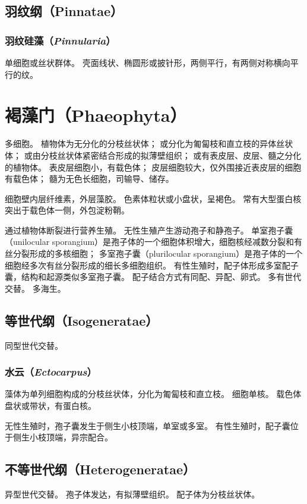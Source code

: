 \documentclass[11pt]{article}
\begin{document}
\subsection{羽纹纲（Pinnatae）}
\subsubsection{羽纹硅藻（\textit{Pinnularia}）}
单细胞或丝状群体。
壳面线状、椭圆形或披针形，两侧平行，有两侧对称横向平行的纹。

\section{褐藻门（Phaeophyta）}
多细胞。
植物体为无分化的分枝丝状体；
或分化为匍匐枝和直立枝的异体丝状体；
或由分枝丝状体紧密结合形成的拟薄壁组织；
或有表皮层、皮层、髓之分化的植物体。
表皮层细胞小，有载色体；
皮层细胞较大，仅外围接近表皮层的细胞有载色体；
髓为无色长细胞，司输导、储存。

\newline

细胞壁内层纤维素，外层藻胶。
色素体粒状或小盘状，呈褐色。
常有大型蛋白核突出于载色体一侧，外包淀粉鞘。

\newline

通过植物体断裂进行营养生殖。
无性生殖产生游动孢子和静孢子。
单室孢子囊（unilocular sporangium）是孢子体的一个细胞体积增大，细胞核经减数分裂和有丝分裂形成的多核细胞；
多室孢子囊（plurilocular sporangium）是孢子体的一个细胞经多次有丝分裂形成的细长多细胞组织。
有性生殖时，配子体形成多室配子囊，结构和起源类似多室孢子囊。
配子结合方式有同配、异配、卵式。
多有世代交替。
多海生。

\subsection{等世代纲（Isogeneratae）}
同型世代交替。

\subsubsection{水云（\textit{Ectocarpus}）}
藻体为单列细胞构成的分枝丝状体，分化为匍匐枝和直立枝。
细胞单核。
载色体盘状或带状，有蛋白核。

\newline

无性生殖时，孢子囊发生于侧生小枝顶端，单室或多室。
有性生殖时，配子囊位于侧生小枝顶端，异宗配合。

\subsection{不等世代纲（Heterogeneratae）}
异型世代交替。
孢子体发达，有拟薄壁组织。
配子体为分枝丝状体。
\end{document}
